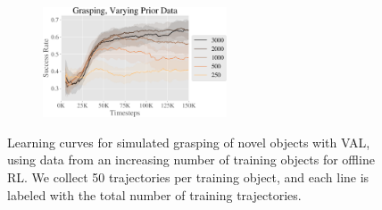 \begin{figure}[t]
    \centering
    \begin{subfigure}[b]{0.99\linewidth}
        \center
        \includegraphics[width=0.6\textwidth]{val/imgs/object_data/vary_data-crop.pdf}
    \end{subfigure}

    \caption{Learning curves for simulated grasping of novel objects with VAL, using data from an increasing number of training objects for offline RL. We collect 50 trajectories per training object, and each line is labeled with the total number of training trajectories. }

    \label{fig:novel_obj}
\end{figure}